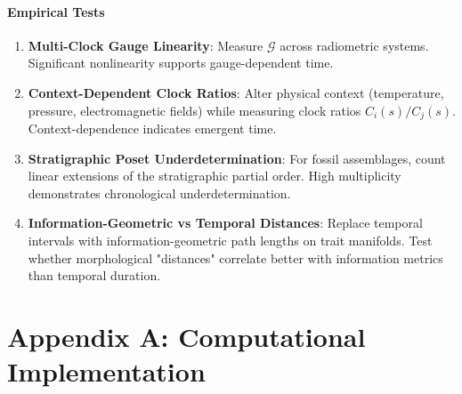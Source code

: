 \documentclass[11pt]{article}
\theoremstyle{definition}
\theoremstyle{plain}
\theoremstyle{remark}
\begin{document}
\paragraph{Empirical Tests}

\begin{enumerate}[label=(E\arabic*)]
\item \textbf{Multi-Clock Gauge Linearity}: Measure $\mathcal{G}$ across radiometric systems. Significant nonlinearity supports gauge-dependent time.

\item \textbf{Context-Dependent Clock Ratios}: Alter physical context (temperature, pressure, electromagnetic fields) while measuring clock ratios $C_i(s)/C_j(s)$. Context-dependence indicates emergent time.

\item \textbf{Stratigraphic Poset Underdetermination}: For fossil assemblages, count linear extensions of the stratigraphic partial order. High multiplicity demonstrates chronological underdetermination.

\item \textbf{Information-Geometric vs Temporal Distances}: Replace temporal intervals with information-geometric path lengths on trait manifolds. Test whether morphological "distances" correlate better with information metrics than temporal duration.
\end{enumerate}

\appendix
\section*{Appendix A: Computational Implementation}
\end{document}
